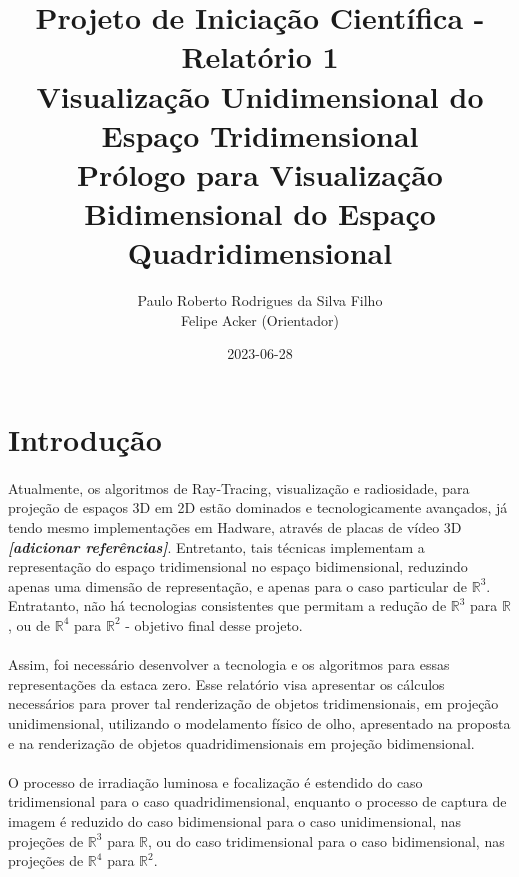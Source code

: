 \documentclass{article}
\title{
	Projeto de Iniciação Científica - Relatório 1\\
	Visualização Unidimensional do Espaço Tridimensional \\
	\large Prólogo para Visualização Bidimensional do Espaço Quadridimensional
}
\date{2023-06-28}
\author{Paulo Roberto Rodrigues da Silva Filho\\ \small Felipe Acker (Orientador)}
\newcommand\R{\mathbb{R}}
\begin{document}
	\renewcommand{\figurename}{Figura}
	\renewcommand{\tablename}{Tabela}
	\renewcommand{\cellalign}{tl}
	\renewcommand{\theadalign}{tl}
	
	\graphicspath{ {./imagens/} }
	\maketitle
	\tableofcontents
	
	\section{Introdução}
	
	\paragraph{}
	Atualmente, os algoritmos de Ray-Tracing, visualização e radiosidade, para projeção de espaços 3D em 2D estão dominados e tecnologicamente avançados, já tendo mesmo implementações em Hadware, através de placas de vídeo 3D \textit{\textbf{[adicionar referências]}}. Entretanto, tais técnicas implementam a representação do espaço tridimensional no espaço bidimensional, reduzindo apenas uma dimensão de representação, e apenas para o caso particular de $\R^3$. Entratanto, não há tecnologias consistentes que permitam a redução de $\R^3$ para $\R$, ou de $\R^4$ para $\R^2$ - objetivo final desse projeto.
	
	\paragraph{}
	Assim, foi necessário desenvolver a tecnologia e os algoritmos para essas representações da estaca zero. Esse relatório visa apresentar os cálculos necessários para prover tal renderização de objetos tridimensionais, em projeção unidimensional, utilizando o modelamento físico de olho, apresentado na proposta e na renderização de objetos quadridimensionais em projeção bidimensional.
	
	\paragraph{}
	O processo de irradiação luminosa e focalização é estendido do caso tridimensional para o caso quadridimensional, enquanto o processo de captura de imagem é reduzido do caso bidimensional para o caso unidimensional, nas projeções de $\R^3$ para $\R$, ou do caso tridimensional para o caso bidimensional, nas projeções de $\R^4$ para $\R^2$.
	
\end{document}
